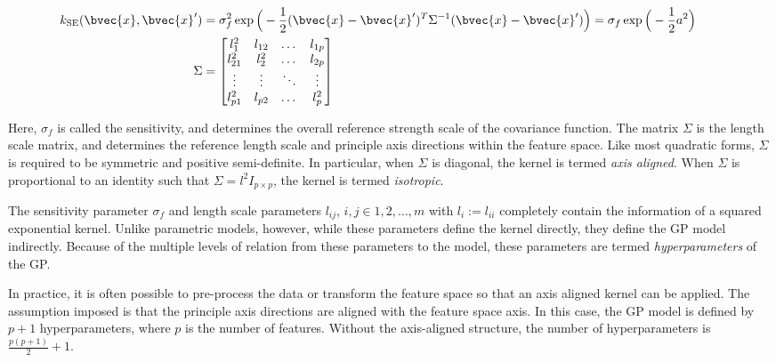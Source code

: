 				\begin{equation}
					\left.
						\begin{aligned}
							k_{\mathrm{SE}}(\bvec{x}, \bvec{x}') &= \sigma_{f}^{2} \exp\Big(-\frac{1}{2}(\bvec{x} - \bvec{x}')^{T} \Sigma^{-1} (\bvec{x} - \bvec{x}')\Big) = \sigma_{f} \exp\Big(-\frac{1}{2} a^{2} \Big) \\
							\Sigma &= 	\begin{bmatrix}
											l_{1}^{2} & l_{12} & \dots & l_{1p} \\
											l_{21}^{2} & l_{2}^{2} & \dots & l_{2p} \\
											\vdots & \vdots  & \ddots & \vdots \\
											l_{p1}^{2} & l_{p2} & \dots & l_{p}^{2} \\
									  	\end{bmatrix}
						\end{aligned}
					\qquad \right.
				\label{Equation:SquaredExponentialKernel}
				\end{equation}
				
				Here, $\sigma_{f}$ is called the sensitivity, and determines the overall reference strength scale of the covariance function. The matrix $\Sigma$ is the length scale matrix, and determines the reference length scale and principle axis directions within the feature space. Like most quadratic forms, $\Sigma$ is required to be symmetric and positive semi-definite. In particular, when $\Sigma$ is diagonal, the kernel is termed \textit{axis aligned}. When $\Sigma$ is proportional to an identity such that $\Sigma = l^{2} I_{p \times p}$, the kernel is termed \textit{isotropic}.
				
				The sensitivity parameter $\sigma_{f}$ and length scale parameters $l_{ij}$, $i, j \in {1, 2, \dots, m}$ with $l_{i} := l_{ii}$ completely contain the information of a squared exponential kernel. Unlike parametric models, however, while these parameters define the kernel directly, they define the GP model indirectly. Because of the multiple levels of relation from these parameters to the model, these parameters are termed \textit{hyperparameters} of the GP.
				
				In practice, it is often possible to pre-process the data or transform the feature space so that an axis aligned kernel can be applied. The assumption imposed is that the principle axis directions are aligned with the feature space axis. In this case, the GP model is defined by $p + 1$ hyperparameters, where $p$ is the number of features. Without the axis-aligned structure, the number of hyperparameters is $\frac{p(p + 1)}{2} + 1$.
				
